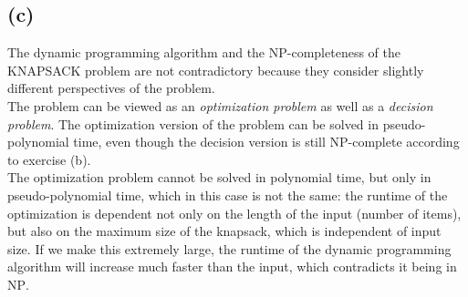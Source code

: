 \subsection{(c)}

The dynamic programming algorithm and the \textsc{NP}-completeness of the \textsc{KNAPSACK} problem are not contradictory because they consider slightly different perspectives of the problem.\\
The problem can be viewed as an \textit{optimization problem} as well as a \textit{decision problem}. The optimization version of the problem can be solved in pseudo-polynomial time, even though the decision version is still \textsc{NP}-complete according to exercise (b).\\
The optimization problem cannot be solved in polynomial time, but only in pseudo-polynomial time, which in this case is not the same: the runtime of the optimization is dependent not only on the length of the input (number of items), but also on the maximum size of the knapsack, which is independent of input size. If we make this extremely large, the runtime of the dynamic programming algorithm will increase much faster than the input, which contradicts it being in \textsc{NP}.


